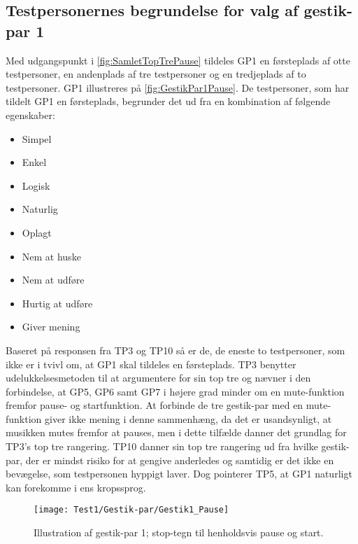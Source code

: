 \subsection{Testpersonernes begrundelse for valg af gestik-par 1}
\label{TestresultaterValgAfGestikkerBegrundelseGP1Pause}
%
Med udgangspunkt i \autoref{fig:SamletTopTrePause} tildeles GP1 en førsteplads af otte testpersoner, en andenplads af tre testpersoner og en tredjeplads af to testpersoner. GP1 illustreres på \autoref{fig:GestikPar1Pause}. De testpersoner, som har tildelt GP1 en førsteplads, begrunder det ud fra en kombination af følgende egenskaber: 
%
\begin{multicols}{3}
    \begin{itemize}
        \item Simpel
        \item Enkel
        \item Logisk
        \item Naturlig
        \item Oplagt
        \item Nem at huske
        \item Nem at udføre
        \item Hurtig at udføre
        \item Giver mening
\end{itemize}
\end{multicols}
\noindent
%
Baseret på responsen fra TP3 og TP10 så er de, de eneste to testpersoner, som ikke er i tvivl om, at GP1 skal tildeles en førsteplads. TP3 benytter udelukkelsesmetoden til at argumentere for sin top tre og nævner i den forbindelse, at GP5, GP6 samt GP7 i højere grad minder om en mute-funktion fremfor pause- og startfunktion. At forbinde de tre gestik-par med en mute-funktion giver ikke mening i denne sammenhæng, da det er usandsynligt, at musikken mutes fremfor at pauses, men i dette tilfælde danner det grundlag for TP3's top tre rangering. TP10 danner sin top tre rangering ud fra hvilke gestik-par, der er mindst risiko for at gengive anderledes og samtidig er det ikke en bevægelse, som testpersonen hyppigt laver. Dog pointerer TP5, at GP1 naturligt kan forekomme i ens kropssprog.
%
\begin{figure}[H]
	\centering
	\texttt{[image: Test1/Gestik-par/Gestik1\_Pause]}
	\caption{Illustration af gestik-par 1; stop-tegn til henholdsvis pause og start.}
	\label{fig:GestikPar1Pause}
\end{figure}
\noindent
%
